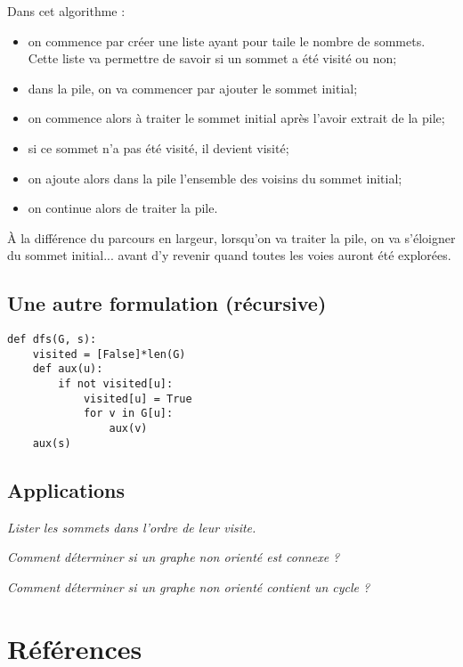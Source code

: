 Dans cet algorithme : 
\begin{itemize}
\item on commence par créer une liste ayant pour taile le nombre de sommets. Cette liste va permettre de savoir si un sommet a été visité ou non;
\item dans la pile, on va commencer par ajouter le sommet initial;
\item on commence alors à traiter le sommet initial après l'avoir extrait de la pile;
\item si ce sommet n'a pas été visité, il devient visité;
\item on ajoute alors dans la pile l'ensemble des voisins du sommet initial;
\item on continue alors de traiter la pile. 
\end{itemize}
À la différence du parcours en largeur, lorsqu'on va traiter la pile, on va s'éloigner du sommet initial... avant d'y revenir quand toutes les voies auront été explorées. 


\subsection{Une autre formulation (récursive)}

\begin{lstlisting}
def dfs(G, s):
    visited = [False]*len(G)
    def aux(u):
        if not visited[u]:
            visited[u] = True
            for v in G[u]:
                aux(v)
    aux(s)

\end{lstlisting}

\subsection{Applications}
\begin{exemple}
\textit{Lister les sommets dans l'ordre de leur visite.}
\end{exemple}


\begin{exemple}
\textit{Comment déterminer si un graphe non orienté est connexe ?}
\end{exemple}


\begin{exemple}
\textit{Comment déterminer si un graphe non orienté contient un cycle ?}
\end{exemple}

\section*{Références}

